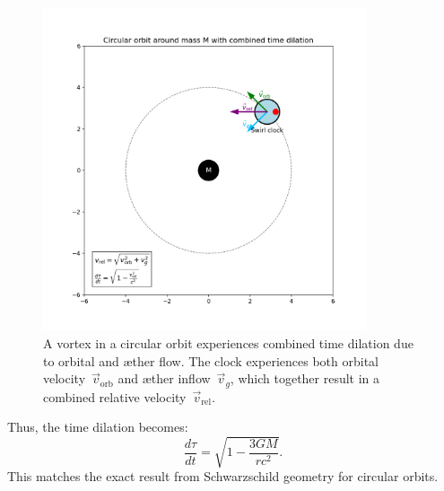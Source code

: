 \begin{figure}[htbp]
    \centering
    \includegraphics[width=0.85\textwidth]{images/08-BaanRondMassa}
    \caption{A vortex in a circular orbit experiences combined time dilation due to orbital and æther flow. The clock experiences both orbital velocity~$\vec{v}_{\mathrm{orb}}$ and æther inflow~$\vec{v}_g$, which together result in a combined relative velocity~$\vec{v}_{\mathrm{rel}}$.}
    \label{fig:BaanRondMassa}
\end{figure}

Thus, the time dilation becomes:
\begin{equation}
\frac{d\tau}{dt} = \sqrt{1 - \frac{3GM}{rc^2}}.
\end{equation}
This matches the exact result from Schwarzschild geometry for circular orbits.

